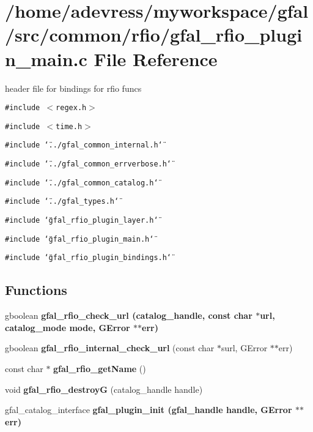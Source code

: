 \section{/home/adevress/myworkspace/gfal/src/common/rfio/gfal\_\-rfio\_\-plugin\_\-main.c File Reference}
\label{gfal__rfio__plugin__main_8c}
header file for bindings for rfio funcs 

{\tt \#include $<$regex.h$>$}\par
{\tt \#include $<$time.h$>$}\par
{\tt \#include \char`\"{}../gfal\_\-common\_\-internal.h\char`\"{}}\par
{\tt \#include \char`\"{}../gfal\_\-common\_\-errverbose.h\char`\"{}}\par
{\tt \#include \char`\"{}../gfal\_\-common\_\-catalog.h\char`\"{}}\par
{\tt \#include \char`\"{}../gfal\_\-types.h\char`\"{}}\par
{\tt \#include \char`\"{}gfal\_\-rfio\_\-plugin\_\-layer.h\char`\"{}}\par
{\tt \#include \char`\"{}gfal\_\-rfio\_\-plugin\_\-main.h\char`\"{}}\par
{\tt \#include \char`\"{}gfal\_\-rfio\_\-plugin\_\-bindings.h\char`\"{}}\par
\subsection*{Functions}
\begin{CompactItemize}
\item 
gboolean \bf{gfal\_\-rfio\_\-check\_\-url} (catalog\_\-handle, const char $\ast$url, catalog\_\-mode mode, GError $\ast$$\ast$err)
\item 
gboolean \textbf{gfal\_\-rfio\_\-internal\_\-check\_\-url} (const char $\ast$surl, GError $\ast$$\ast$err)\label{gfal__rfio__plugin__main_8c_42f38c81dceec6a03f5ef4194bf302de}

\item 
const char $\ast$ \textbf{gfal\_\-rfio\_\-get\-Name} ()\label{gfal__rfio__plugin__main_8c_52d0ae5bb90146d1c3859f7eafa517fa}

\item 
void \textbf{gfal\_\-rfio\_\-destroy\-G} (catalog\_\-handle handle)\label{gfal__rfio__plugin__main_8c_5d5e134df56b9dab9254ac9ba04c7671}

\item 
gfal\_\-catalog\_\-interface \bf{gfal\_\-plugin\_\-init} (gfal\_\-handle handle, GError $\ast$$\ast$err)
\end{CompactItemize}


